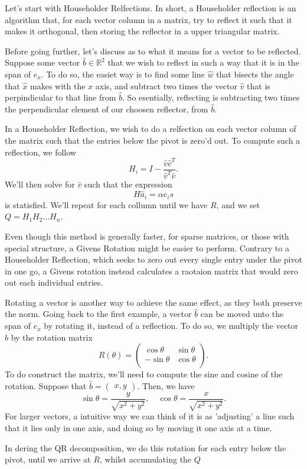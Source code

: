 \documentclass[5pt, a4paper]{article}
\begin{document}
    Let's start with Householder Relfections. In short, a Householder reflection
    is an algorithm that, for each vector column in a matrix, try to reflect it
    such that it makes it orthogonal, then storing the reflector in a upper
    triangular matrix.   

    Before going further, let's  discuss as to what it means for a vector to be
    reflected. Suppose some vector $\hat{b} \in \mathbb{R}^2$ that we wish to
    reflect in such a way that it is in the span of $e_x$. To do so, the easiet
    way is to find some line $\hat{w}$ that bisects the angle that $\hat{x}$
    makes with the $x$ axis, and subtract two times the vector $\hat{v}$ that is
    perpindicular to that line from $\hat{b}$. So esentially, reflecting is
    subtracting two times the perpendicular element of our choosen reflector,
    from $\hat{b}$.

    In a Householder Reflection, we wish to do a relfection on each vector
    column of the matrix such that the entries below the pivot is zero'd out. To
    compute such a reflection, we follow \[
        H_i = I - \frac{\hat{v}\hat{v}^{T}}{\hat{v}^{T}\hat{v}}
    .\] 
    We'll then solve for $\hat{v}$ such that the expression \[
        H\hat{a}_i = \alpha e_i
    s\] 
    is statisfied. We'll repeat for each collumn until we have $R$, and we set
     $Q = H_1H_2\ldots H_n$.

     Even though this method is generally faster, for sparse matrices, or those
     with special structure, a Givens Rotation might be easier to perform.
     Contrary to a Householder Reflection, which seeks to zero out every single
     entry under the pivot in one go, a Givens rotation instead calculates a
     raotaion matrix that would zero out each individual entries. 

     Rotating a vector is another way to achieve the same effect, as they both
     preserve the norm. Going back to the first example, a vector $\hat{b}$ can
     be moved unto the span of $e_x$ by rotating it, instead of a reflection. To
     do so, we multiply the vector $\hat{b}$ by the rotation matrix \[
     R(\theta) = \begin{pmatrix} 
         \cos \theta &  \sin \theta \\ -\sin \theta & \cos \theta \\
     \end{pmatrix} 
     .\] 
     To do construct the matrix, we'll need to compute the sine and cosine of
     the rotation. Suppose that $\hat{b} = \begin{pmatrix} x, y \end{pmatrix} $.
     Then, we have \[
      \sin \theta = \frac{y}{\sqrt{x^2+y^2} }, \quad \cos \theta =
      \frac{x}{\sqrt{x^2+y^2} }
     .\] 
     For larger vectors, a intuitive way we can think of it is as 'adjusting' a
     line such that it lies only in one axis, and doing so by moving it one axis
     at a time.

     In dering the QR decomposition, we do this  rotation for each entry below
     the pivot, until we arrive at $R$, whilst accumulating the  $Q$

    
\end{document}
